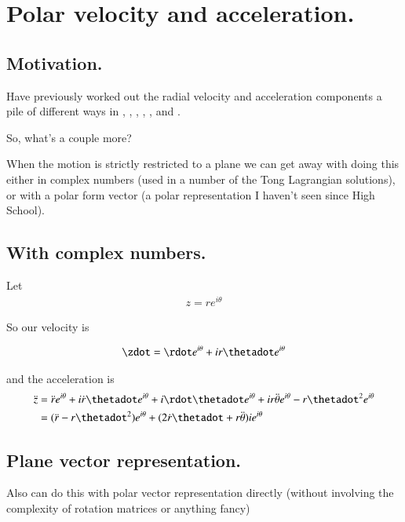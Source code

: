 \chapter{Polar velocity and acceleration.}
\label{chap:radial}
\date{Jan 13, 2009.  radial.tex}

\section{Motivation. }

Have previously worked out the radial velocity and acceleration components a pile of different ways in
, 
, 
, 
, 
, and
.

So, what's a couple more?

When the motion is strictly restricted to a plane we can get away with doing this either in complex numbers
(used in a number of the Tong Lagrangian solutions), or with a polar form  vector (a polar representation
I haven't seen since High School).

\section{With complex numbers. }

Let
\begin{align*}
z = r e^{i\theta}
\end{align*}

So our velocity is

\begin{align*}
\zdot = \rdot e^{i\theta} + i r \thetadot e^{i\theta}
\end{align*}

and the acceleration is
\begin{align*}
\ddot{z}
&= \ddot{r} e^{i\theta} + i \dot{r} \thetadot e^{i\theta}
 + i \rdot \thetadot e^{i\theta}
 + i r \ddot{\theta} e^{i\theta}
 - r \thetadot^2 e^{i\theta} \\
&= (\ddot{r} - r \thetadot^2 ) e^{i\theta} + (2 \dot{r} \thetadot + r \ddot{\theta} ) i e^{i\theta}
\end{align*}

\section{Plane vector representation. }

Also can do this with polar vector representation directly (without involving the complexity of rotation matrices or anything fancy)

